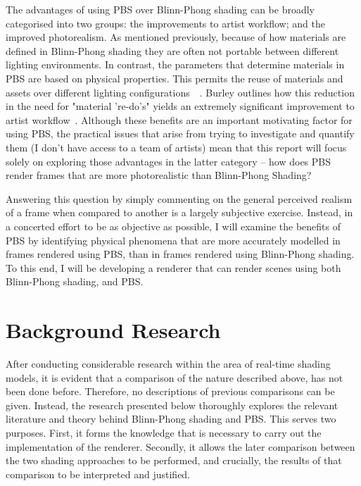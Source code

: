 The advantages of using PBS over Blinn-Phong shading can be broadly categorised into two groups: the improvements to artist workflow; and the improved photorealism. As mentioned previously, because of how materials are defined in Blinn-Phong shading they are often not portable between different lighting environments. In contrast, the parameters that determine materials in PBS are based on physical properties. This permits the reuse of materials and assets over different lighting configurations~\cite{MovingFrostbitetoPBR}~\cite{SIGGRAPH2020Course}. Burley outlines how this reduction in the need for "material 're-do's" yields an extremely significant improvement to artist workflow~\cite{Burley2012Physically}. Although these benefits are an important motivating factor for using PBS, the practical issues that arise from trying to investigate and quantify them (I don’t have access to a team of artists) mean that this report will focus solely on exploring those advantages in the latter category – how does PBS render frames that are more photorealistic than Blinn-Phong Shading?

Answering this question by simply commenting on the general perceived realism of a frame when compared to another is a largely subjective exercise. Instead, in a concerted effort to be as objective as possible, I will examine the benefits of PBS by identifying physical phenomena that are more accurately modelled in frames rendered using PBS, than in frames rendered using Blinn-Phong shading. To this end, I will be developing a renderer that can render scenes using both Blinn-Phong shading, and PBS.

\section{Background Research}

After conducting considerable research within the area of real-time shading models, it is evident that a comparison of the nature described above, has not been done before. Therefore, no descriptions of previous comparisons can be given. Instead, the research presented below thoroughly explores the relevant literature and theory behind Blinn-Phong shading and PBS. This serves two purposes. First, it forms the knowledge that is necessary to carry out the implementation of the renderer. Secondly, it allows the later comparison between the two shading approaches to be performed, and crucially, the results of that comparison to be interpreted and justified.

